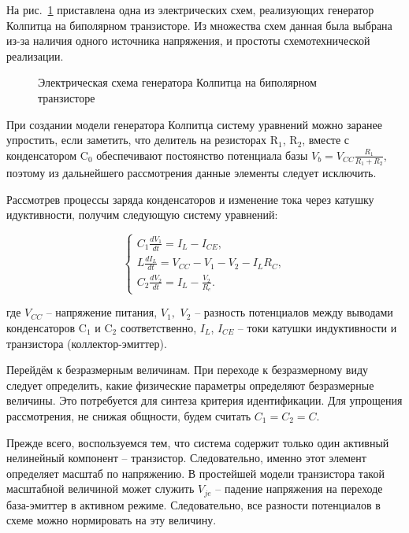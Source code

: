 \documentclass[a4paper,12pt]{article}
\begin{document}
На рис.~\ref{atu:f:colp_schem} приставлена одна из электрических схем,
реализующих генератор Колпитца на биполярном транзисторе.
Из множества схем данная была выбрана из-за наличия
одного источника напряжения, и простоты схемотехнической реализации.


\begin{figure}[htb!]
\begin{center}

\end{center}
\caption{Электрическая схема генератора Колпитца на биполярном транзисторе}
\label{atu:f:colp_schem}
\end{figure}

При создании модели генератора Колпитца систему уравнений можно
заранее упростить, если заметить, что
делитель на резисторах
$\mathrm{R}_1$, $\mathrm{R}_2$,
вместе с конденсатором
$\mathrm{C}_0$ обеспечивают
постоянство потенциала базы
$V_b = V_{CC} \frac{R_1}{R_1+R_2}$,
поэтому из дальнейшего рассмотрения данные элементы следует
исключить.

Рассмотрев процессы заряда конденсаторов и изменение тока через
катушку идуктивности, получим следующую систему уравнений:

\begin{equation}
\label{atu:eq:colp_phys}
\begin{cases}
  C_1 \frac{dV_{1}}{dt}  = I_L - I_{CE} , \\
  L   \frac{dI_L}{dt}    = V_{CC} - V_{1} - V_{2} - I_L R_C , \\
  C_2 \frac{dV_{2}}{dt}  = I_L - \frac{V_{2}}{R_e}.
\end{cases}
\end{equation}


\noindent
где
$V_{CC} $ -- напряжение питания,
$V_1,$ $V_2$ -- разность потенциалов между выводами конденсаторов
$\mathrm{C}_1$ и $\mathrm{C}_2$ соответственно,
$I_L$, $I_{CE}$ -- токи катушки индуктивности и транзистора (коллектор-эмиттер).

Перейдём к безразмерным величинам.
При переходе к безразмерному виду следует определить,
какие физические параметры определяют безразмерные величины.
Это потребуется для синтеза критерия идентификации.
Для упрощения рассмотрения, не снижая общности,
будем считать $C_1 = C_2 = C$.

Прежде всего, воспользуемся тем, что система содержит только один
активный нелинейный компонент -- транзистор.
Следовательно, именно этот элемент определяет
масштаб по напряжению. В простейшей модели транзистора
такой масштабной величиной может служить
$V_{je}$ -- падение напряжения на переходе база-эмиттер
в активном режиме. Следовательно, все разности потенциалов в схеме можно нормировать
на эту величину.
\end{document}
